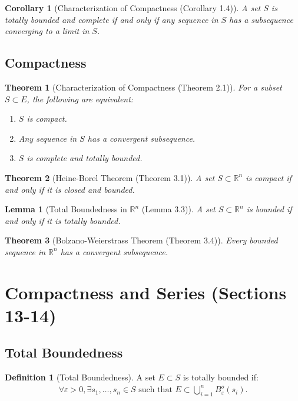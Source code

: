 \documentclass[9pt]{article}
\theoremstyle{definition}
\newtheorem{definition}{Definition}
\theoremstyle{plain}
\newtheorem{theorem}{Theorem}
\newtheorem{corollary}{Corollary}
\newtheorem{lemma}{Lemma}
\begin{document}
\begin{corollary}[Characterization of Compactness (Corollary 1.4)]
A set $ S $ is totally bounded and complete if and only if any sequence in $ S $ has a subsequence converging to a limit in $ S $.
\end{corollary}

\subsection*{Compactness}
\begin{theorem}[Characterization of Compactness (Theorem 2.1)]
For a subset $ S \subset E $, the following are equivalent:
\begin{enumerate}
    \item $ S $ is compact.
    \item Any sequence in $ S $ has a convergent subsequence.
    \item $ S $ is complete and totally bounded.
\end{enumerate}
\end{theorem}

\begin{theorem}[Heine-Borel Theorem (Theorem 3.1)]
A set $ S \subset \mathbb{R}^n $ is compact if and only if it is closed and bounded.
\end{theorem}

\begin{lemma}[Total Boundedness in $ \mathbb{R}^n $ (Lemma 3.3)]
A set $ S \subset \mathbb{R}^n $ is bounded if and only if it is totally bounded.
\end{lemma}

\begin{theorem}[Bolzano-Weierstrass Theorem (Theorem 3.4)]
Every bounded sequence in $ \mathbb{R}^n $ has a convergent subsequence.
\end{theorem}
\section*{Compactness and Series (Sections 13-14)}

\subsection*{Total Boundedness}
\begin{definition}[Total Boundedness]
A set $ E \subset S $ is totally bounded if:
\begin{align}
\forall \varepsilon > 0, \exists s_1, \ldots, s_n \in S \text{ such that } E \subset \bigcup_{i=1}^n B_\varepsilon^o(s_i).
\end{align}
\end{definition}
\end{document}
